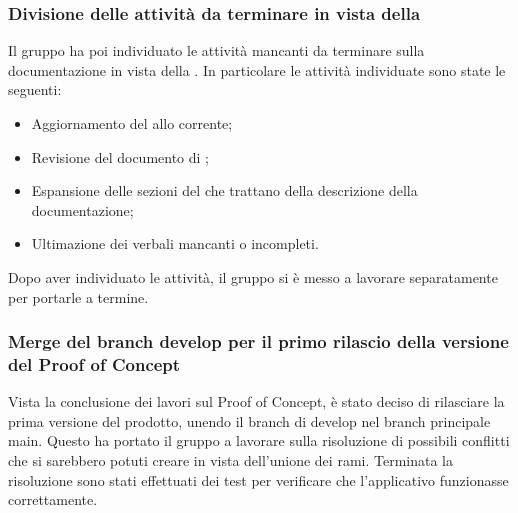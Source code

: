 \subsubsection{Divisione delle attività da terminare in vista della \RTB}
\par Il gruppo ha poi individuato le attività mancanti da terminare sulla documentazione in vista della \RTB. In particolare le attività individuate sono state le seguenti:
\begin{itemize}
	\item Aggiornamento del \PdP allo  corrente;
	\item Revisione del documento di \AdR;
	\item Espansione delle sezioni del \PdQ che trattano della descrizione della documentazione;\
	\item Ultimazione dei verbali mancanti o incompleti.
\end{itemize}
Dopo aver individuato le attività, il gruppo si è messo a lavorare separatamente per portarle a termine.

\subsubsection{Merge del branch develop per il primo rilascio della versione del Proof of Concept}
\par Vista la conclusione dei lavori sul Proof of Concept, è stato deciso di rilasciare la prima versione del prodotto, unendo il branch di develop nel branch principale main. Questo ha portato il gruppo a lavorare sulla risoluzione di possibili conflitti che si sarebbero potuti creare in vista dell'unione dei rami.
Terminata la risoluzione sono stati effettuati dei test per verificare che l'applicativo funzionasse correttamente.